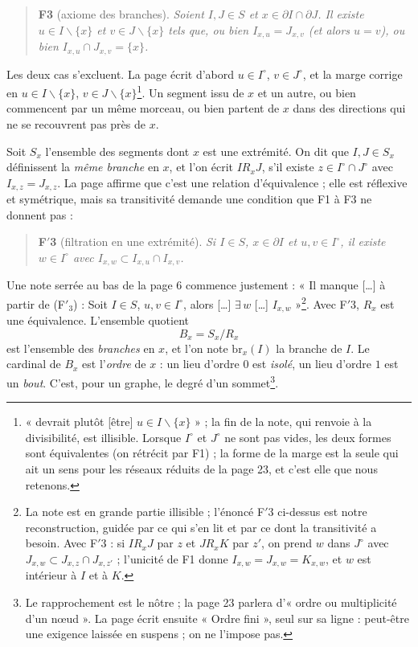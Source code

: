 \documentclass[11pt,a4paper]{article}
\begin{document}
\begin{quote}
\textbf{F3} (axiome des branches). \emph{Soient $I, J \in S$ et $x \in
\partial I \cap \partial J$. Il existe $u \in I \smallsetminus \{x\}$ et $v
\in J \smallsetminus \{x\}$ tels que, ou bien $I_{x,u} = J_{x,v}$ (et alors
$u = v$), ou bien $I_{x,u} \cap J_{x,v} = \{x\}$.}
\end{quote}

Les deux cas s'excluent. La page écrit d'abord $u \in I^{\circ}$, $v \in
J^{\circ}$, et la marge corrige en $u \in I \smallsetminus \{x\}$, $v \in J
\smallsetminus \{x\}$\footnote{« devrait plutôt [être] $u \in I
\smallsetminus \{x\}$ » ; la fin de la note, qui renvoie à la divisibilité, est
illisible. Lorsque $I^{\circ}$ et $J^{\circ}$ ne sont pas vides, les deux
formes sont équivalentes (on rétrécit par F1) ; la forme de la marge est la
seule qui ait un sens pour les réseaux réduits de la page 23, et c'est elle
que nous retenons.}. Un segment issu de $x$ et un autre, ou bien commencent
par un même morceau, ou bien partent de $x$ dans des directions qui ne se
recouvrent pas près de $x$.

Soit $S_{x}$ l'ensemble des segments dont $x$ est une extrémité. On dit que
$I, J \in S_{x}$ définissent la \emph{même branche} en $x$, et l'on écrit $I
\mathrel{R_{x}} J$, s'il existe $z \in I^{\circ} \cap J^{\circ}$ avec $I_{x,z}
= J_{x,z}$. La page affirme que c'est une relation d'équivalence ; elle est
réflexive et symétrique, mais sa transitivité demande une condition que F1 à
F3 ne donnent pas :
\begin{quote}
\textbf{F$'$3} (filtration en une extrémité). \emph{Si $I \in S$, $x \in
\partial I$ et $u, v \in I^{\circ}$, il existe $w \in I^{\circ}$ avec $I_{x,w}
\subset I_{x,u} \cap I_{x,v}$.}
\end{quote}
Une note serrée au bas de la page 6 commence justement : « Il manque [\dots]
à partir de (F$'_{3}$) : Soit $I \in S$, $u, v \in I^{\circ}$, alors [\dots]
$\exists\, w$ [\dots] $I_{x,w}$ »\footnote{La note est en grande partie
illisible ; l'énoncé F$'$3 ci-dessus est notre reconstruction, guidée par ce
qui s'en lit et par ce dont la transitivité a besoin. Avec F$'$3 : si $I
\mathrel{R_{x}} J$ par $z$ et $J \mathrel{R_{x}} K$ par $z'$, on prend $w$
dans $J^{\circ}$ avec $J_{x,w} \subset J_{x,z} \cap J_{x,z'}$ ; l'unicité de
F1 donne $I_{x,w} = J_{x,w} = K_{x,w}$, et $w$ est intérieur à $I$ et à $K$.}.
Avec F$'$3, $R_{x}$ est une équivalence. L'ensemble quotient
\[
B_{x} = S_{x} / R_{x}
\]
est l'ensemble des \emph{branches} en $x$, et l'on note $\mathrm{br}_{x}(I)$
la branche de $I$. Le cardinal de $B_{x}$ est l'\emph{ordre} de $x$ : un lieu
d'ordre $0$ est \emph{isolé}, un lieu d'ordre $1$ est un \emph{bout}. C'est,
pour un graphe, le degré d'un sommet\footnote{Le rapprochement est le nôtre ;
la page 23 parlera d'« ordre ou multiplicité d'un nœud ». La page écrit
ensuite « Ordre fini », seul sur sa ligne : peut-être une exigence laissée en
suspens ; on ne l'impose pas.}.
\end{document}
